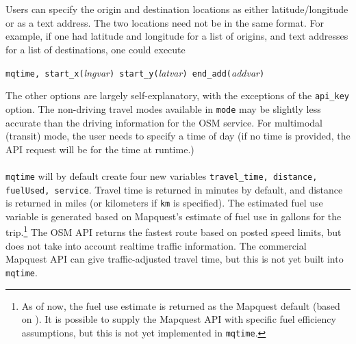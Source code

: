 \documentclass[12pt]{article}
\begin{document}
\\ \\
Users can specify the origin and destination locations as either latitude/longitude or as a text address. The two locations need not be in the same format. For example, if one had latitude and longitude for a list of origins, and text addresses for a list of destinations, one could execute
\begin{center}
\verb|mqtime, start_x(|\textit{lngvar}\verb|) start_y(|\textit{latvar}\verb|) end_add(|\textit{addvar}\verb|)|
\end{center}
The other options are largely self-explanatory, with the exceptions of the \verb|api_key| option. The non-driving travel modes available in \verb|mode| may be slightly less accurate than the driving information for the OSM service. For multimodal (transit) mode, the user needs to specify a time of day (if no time is provided, the API request will be for the time at runtime.)
\\ \\
\verb|mqtime| will by default create four new variables \verb|travel_time, distance, fuelUsed, service|. Travel time is returned in minutes by default, and distance is returned in miles (or kilometers if \verb|km| is specified). The estimated fuel use variable is generated based on Mapquest's estimate of fuel use in gallons for the trip.\footnote{As of now, the fuel use estimate is returned as the Mapquest default (based on ). It is possible to supply the Mapquest API with specific fuel efficiency assumptions, but this is not yet implemented in \texttt{mqtime}.} The OSM API returns the fastest route based on posted speed limits, but does not take into account realtime traffic information. The commercial Mapquest API can give traffic-adjusted travel time, but this is not yet built into \verb|mqtime|.
\end{document}
